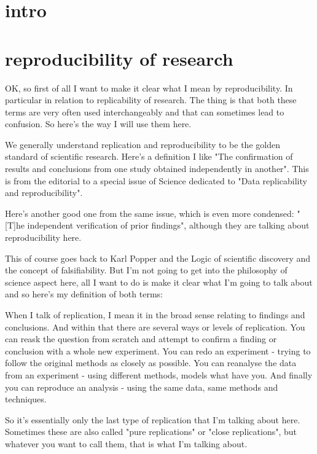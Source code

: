 \documentclass[12pt]{article}
\begin{document}
\tableofcontents

\newpage
\section{intro}

\section{reproducibility of research}

OK, so first of all I want to make it clear what I mean by reproducibility. In particular in relation to replicability of research. The thing is that both these terms are very often used interchangeably and that can sometimes lead to confusion. So here's the way I will use them here. 

We generally understand replication and reproducibility to be the golden standard of scientific research. Here's a definition I like "The confirmation of results and conclusions from one study obtained independently in another". This is from the editorial to a special issue of Science dedicated to "Data replicability and reproducibility". 

Here's another good one from the same issue, which is even more condensed: "[T]he independent verification of prior findings", although they are talking about reproducibility here. 

This of course goes back to Karl Popper and the Logic of scientific discovery and the concept of falsifiability. But I'm not going to get into the philosophy of science aspect here, all I want to do is make it clear what I'm going to talk about and so here's my definition of both terms:

When I talk of replication, I mean it in the broad sense relating to findings and conclusions. And within that there are several ways or levels of replication.
You can reask the question from scratch and attempt to confirm a finding or conclusion with a whole new experiment. You can redo an experiment - trying to follow the original methods as closely as possible. You can reanalyse the data from an experiment - using different methods, models what have you. And finally you can reproduce an analysis - using the same data, same methods and techniques. 

So it's essentially only the last type of replication that I'm talking about here. Sometimes these are also called "pure replications" or "close replications", but whatever you want to call them, that is what I'm talking about. 
\end{document}

